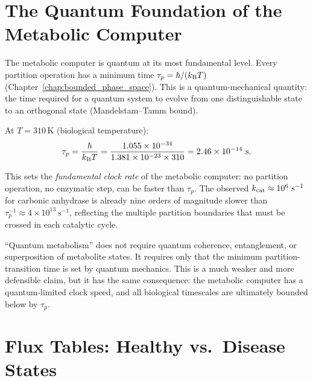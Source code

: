 \section{The Quantum Foundation of the Metabolic Computer}
\label{sec:quantum_metabolism}

The metabolic computer is quantum at its most fundamental level. Every
partition operation has a minimum time $\tau_p = \hbar / (k_{\mathrm{B}} T)$
(Chapter~\ref{chap:bounded_phase_space}). This is a quantum-mechanical
quantity: the time required for a quantum system to evolve from one
distinguishable state to an orthogonal state (Mandelstam--Tamm bound).

At $T = 310$\,K (biological temperature):
\begin{equation}
  \tau_p = \frac{\hbar}{k_{\mathrm{B}} T}
         = \frac{1.055 \times 10^{-34}}{1.381 \times 10^{-23} \times 310}
         = 2.46 \times 10^{-14}\ \mathrm{s}.
  \label{eq:tau_p_bio}
\end{equation}

This sets the \emph{fundamental clock rate} of the metabolic computer:
no partition operation, no enzymatic step, can be faster than $\tau_p$.
The observed $\kcat \approx 10^6\ \mathrm{s}^{-1}$ for carbonic anhydrase
is already nine orders of magnitude slower than $\tau_p^{-1} \approx
4 \times 10^{13}\ \mathrm{s}^{-1}$, reflecting the multiple partition
boundaries that must be crossed in each catalytic cycle.

\begin{remark}
``Quantum metabolism'' does not require quantum coherence, entanglement, or
superposition of metabolite states. It requires only that the minimum
partition-transition time is set by quantum mechanics. This is a much
weaker and more defensible claim, but it has the same consequence: the
metabolic computer has a quantum-limited clock speed, and all biological
timescales are ultimately bounded below by $\tau_p$.
\end{remark}

\section{Flux Tables: Healthy vs.\ Disease States}
\label{sec:flux_tables}

